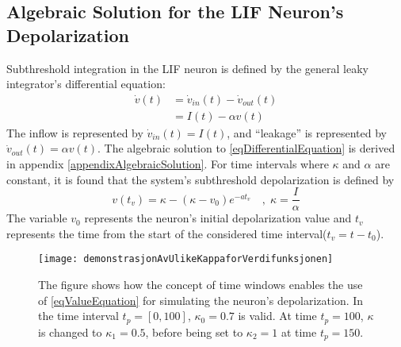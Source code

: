 	\subsection{Algebraic Solution for the LIF Neuron's Depolarization}
	\label{ssecTheAlgebraicSolution}
		Subthreshold integration in the LIF neuron is defined by the general leaky integrator's differential equation\cite{gerstnerKistler2002}: %
		\begin{equation}
			\begin{split}
				\dot{v}(t)&= \dot{v}_{in}(t) - \dot{v}_{out}(t) \\
					&= I(t) - \alpha v(t)
			\end{split}
			\label{eqDifferentialEquation}
		\end{equation}
		The inflow is represented by $\dot{v}_{in}(t) = I(t)$, and ``leakage'' is represented by $\dot{v}_{out}(t) = \alpha v(t)$.
		The algebraic solution to \ref{eqDifferentialEquation} is derived in appendix \ref{appendixAlgebraicSolution}.
 		For time intervals where $\kappa$ and $\alpha$ are constant, it is found that the system's subthreshold depolarization is defined by %
		\begin{equation}
			v(t_v) = \kappa - \left( \kappa - v_0 \right) e^{-at_v} 	\quad,\; \kappa = \frac{I}{\alpha} %
			\label{eqValueEquation}
		\end{equation}
		The variable $v_0$ represents the neuron's initial depolarization value and $t_v$ represents the time from the start of the considered time interval\mbox{($t_v = t - t_0$)}.
\begin{figure}[htb!p]
    \centering
    \texttt{[image: demonstrasjonAvUlikeKappaforVerdifunksjonen]}
 	  \caption[Illustration of how time windows can be utilized to simulated the neuron by the algebraic equation]{
			The figure shows how the concept of time windows enables the use of \eqref{eqValueEquation} for simulating the neuron's depolarization.
			In the time interval $t_p = [0, 100]$, $\kappa_0 = 0.7$ is valid.
			At time $t_p = 100$, $\kappa$ is changed to $\kappa_1 = 0.5$, before being set to $\kappa_2 = 1$ at time $t_p = 150$.
			\cite{FDP_report}
			}
\end{figure}
